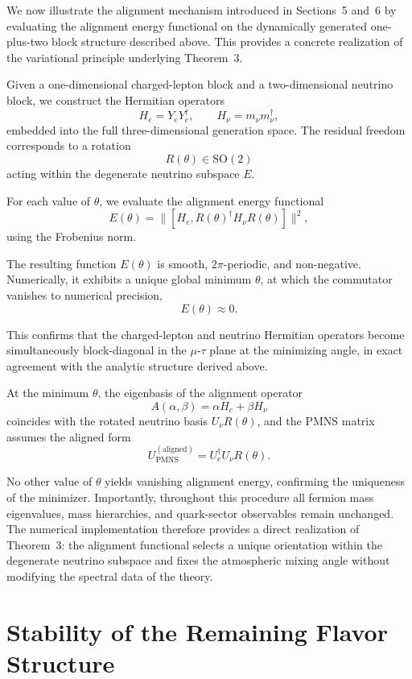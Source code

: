 We now illustrate the alignment mechanism introduced in Sections~5 and~6 by evaluating the alignment energy functional on the dynamically generated one-plus-two block structure described above. This provides a concrete realization of the variational principle underlying Theorem~3.

Given a one-dimensional charged-lepton block and a two-dimensional neutrino block, we construct the Hermitian operators
\[
H_e = Y_e Y_e^\dagger,\qquad
H_\nu = m_\nu m_\nu^\dagger,
\]
embedded into the full three-dimensional generation space. The residual freedom corresponds to a rotation
\[
R(\theta)\in\mathrm{SO}(2)
\]
acting within the degenerate neutrino subspace $E$.

For each value of $\theta$, we evaluate the alignment energy functional
\[
E(\theta)
= \big\| [H_e, R(\theta)^\dagger H_\nu R(\theta)] \big\|^2,
\]
using the Frobenius norm.

The resulting function $E(\theta)$ is smooth, $2\pi$-periodic, and non-negative. Numerically, it exhibits a unique global minimum $\theta$, at which the commutator vanishes to numerical precision,
\[
E(\theta)\approx 0.
\]

This confirms that the charged-lepton and neutrino Hermitian operators become simultaneously block-diagonal in the $\mu$-$\tau$ plane at the minimizing angle, in exact agreement with the analytic structure derived above.

At the minimum $\theta$, the eigenbasis of the alignment operator
\[
A(\alpha,\beta)=\alpha H_e + \beta H_\nu
\]
coincides with the rotated neutrino basis $U_\nu R(\theta)$, and the PMNS matrix assumes the aligned form
\[
U_{\mathrm{PMNS}}^{(\mathrm{aligned})}
= U_e^\dagger U_\nu R(\theta).
\]

No other value of $\theta$ yields vanishing alignment energy, confirming the uniqueness of the minimizer. Importantly, throughout this procedure all fermion mass eigenvalues, mass hierarchies, and quark-sector observables remain unchanged. The numerical implementation therefore provides a direct realization of Theorem~3: the alignment functional selects a unique orientation within the degenerate neutrino subspace and fixes the atmospheric mixing angle without modifying the spectral data of the theory.


\section{Stability of the Remaining Flavor Structure}

